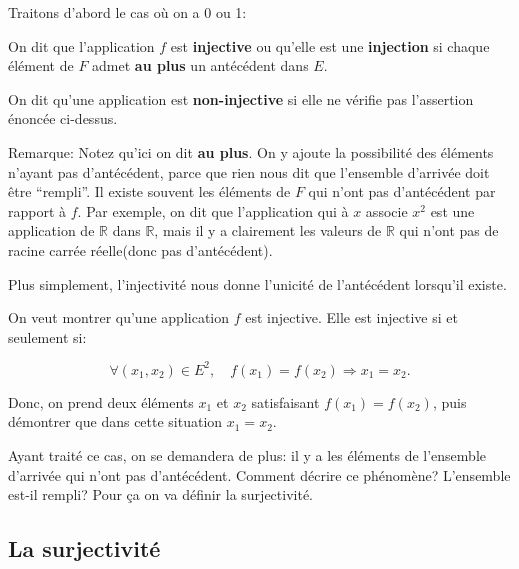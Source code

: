 \documentclass{article}
\begin{document}
Traitons d'abord le cas où on a 0 ou 1:

\begin{tcolorbox}[colback=red!5!white,colframe=red!75!black,title=Définition 3.3]

On dit que l'application $f$ est \textbf{injective} ou qu'elle est une \textbf{injection} si chaque élément de $F$ admet \textbf{au plus} un antécédent dans $E$.

\tcblower

On dit qu'une application est \textbf{non-injective} si elle ne vérifie pas l'assertion énoncée ci-dessus.

\end{tcolorbox}

Remarque: Notez qu'ici on dit \textbf{au plus}. On y ajoute la possibilité des éléments n'ayant pas d'antécédent, parce que rien nous dit que l'ensemble d'arrivée doit être ``rempli''. Il existe souvent les éléments de $F$ qui n'ont pas d'antécédent par rapport à $f$. Par exemple, on dit que l'application qui à $x$ associe $x^{2}$ est une application de $\mathbb{R}$ dans $\mathbb{R}$, mais il y a clairement les valeurs de $\mathbb{R}$ qui n'ont pas de racine carrée réelle(donc pas d'antécédent).

Plus simplement, l'injectivité nous donne l'unicité de l'antécédent lorsqu'il existe.



\begin{tcolorbox}[colback=green!5!white,colframe=green!75!black,title=Point méthode 3.1]

On veut montrer qu'une application $f$ est injective. Elle est injective si et seulement si:

\[
\forall (x_1, x_2) \in E^2, \quad f(x_1) = f(x_2) \Rightarrow x_1 = x_2.
\]

Donc, on prend deux éléments $x_{1}$ et $x_{2}$ satisfaisant $f(x_1) = f(x_2)$, puis démontrer que dans cette situation $x_1 = x_2$.



\end{tcolorbox}




Ayant traité ce cas, on se demandera de plus: il y a les éléments de l'ensemble d'arrivée qui n'ont pas d'antécédent. Comment décrire ce phénomène? L'ensemble est-il rempli? Pour \c ca on va définir la surjectivité.






\subsection{La surjectivité}
\end{document}
